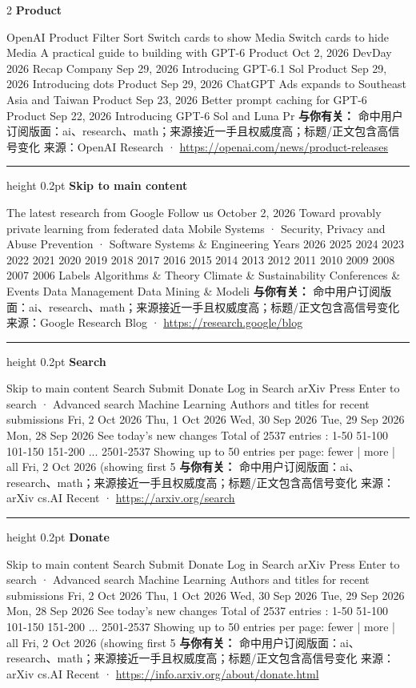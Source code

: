 \documentclass[10.5pt]{ctexart}
\begin{document}
\begin{multicols}{2}
{\large\bfseries Product}\par
OpenAI Product Filter Sort Switch cards to show Media Switch cards to hide Media A practical guide to building with GPT-6 Product Oct 2, 2026 DevDay 2026 Recap Company Sep 29, 2026 Introducing GPT-6.1 Sol Product Sep 29, 2026 Introducing dots Product Sep 29, 2026 ChatGPT Ads expands to Southeast Asia and Taiwan Product Sep 23, 2026 Better prompt caching for GPT-6 Product Sep 22, 2026 Introducing GPT-6 Sol and Luna Pr
\textbf{与你有关：} 命中用户订阅版面：ai、research、math；来源接近一手且权威度高；标题/正文包含高信号变化
{\footnotesize\color{ormuted} 来源：OpenAI Research · \url{https://openai.com/news/product-releases}}
\vspace{2mm}
\hrule height 0.2pt
\vspace{2mm}
{\large\bfseries Skip to main content}\par
The latest research from Google Follow us October 2, 2026 Toward provably private learning from federated data Mobile Systems · Security, Privacy and Abuse Prevention · Software Systems \& Engineering Years 2026 2025 2024 2023 2022 2021 2020 2019 2018 2017 2016 2015 2014 2013 2012 2011 2010 2009 2008 2007 2006 Labels Algorithms \& Theory Climate \& Sustainability Conferences \& Events Data Management Data Mining \& Modeli
\textbf{与你有关：} 命中用户订阅版面：ai、research、math；来源接近一手且权威度高；标题/正文包含高信号变化
{\footnotesize\color{ormuted} 来源：Google Research Blog · \url{https://research.google/blog}}
\vspace{2mm}
\hrule height 0.2pt
\vspace{2mm}
{\large\bfseries Search}\par
Skip to main content Search Submit Donate Log in Search arXiv Press Enter to search · Advanced search Machine Learning Authors and titles for recent submissions Fri, 2 Oct 2026 Thu, 1 Oct 2026 Wed, 30 Sep 2026 Tue, 29 Sep 2026 Mon, 28 Sep 2026 See today's new changes Total of 2537 entries : 1-50 51-100 101-150 151-200 ... 2501-2537 Showing up to 50 entries per page: fewer | more | all Fri, 2 Oct 2026 (showing first 5
\textbf{与你有关：} 命中用户订阅版面：ai、research、math；来源接近一手且权威度高；标题/正文包含高信号变化
{\footnotesize\color{ormuted} 来源：arXiv cs.AI Recent · \url{https://arxiv.org/search}}
\vspace{2mm}
\hrule height 0.2pt
\vspace{2mm}
{\large\bfseries Donate}\par
Skip to main content Search Submit Donate Log in Search arXiv Press Enter to search · Advanced search Machine Learning Authors and titles for recent submissions Fri, 2 Oct 2026 Thu, 1 Oct 2026 Wed, 30 Sep 2026 Tue, 29 Sep 2026 Mon, 28 Sep 2026 See today's new changes Total of 2537 entries : 1-50 51-100 101-150 151-200 ... 2501-2537 Showing up to 50 entries per page: fewer | more | all Fri, 2 Oct 2026 (showing first 5
\textbf{与你有关：} 命中用户订阅版面：ai、research、math；来源接近一手且权威度高；标题/正文包含高信号变化
{\footnotesize\color{ormuted} 来源：arXiv cs.AI Recent · \url{https://info.arxiv.org/about/donate.html}}
\end{multicols}
\end{document}
